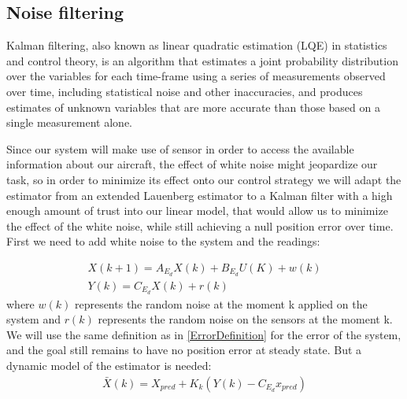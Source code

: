\documentclass[twocolumn,showpacs,
    nofootinbib,aps,superscriptaddress,
    eqsecnum,prd,showkeys,10pt,floatfix]{revtex4}
\begin{document}
\subsection{Noise filtering}
Kalman filtering, also known as linear quadratic estimation (LQE) in statistics
and control theory, is an algorithm that estimates a joint probability
distribution over the variables for each time-frame using a series of
measurements observed over time, including statistical noise and other
inaccuracies, and produces estimates of unknown variables that are more
accurate than those based on a single measurement alone.
\par
Since our system will make use of sensor in order to access the available
information about our aircraft, the effect of white noise might jeopardize our
task, so in order to minimize its effect onto our control strategy we will
adapt the estimator from an extended Lauenberg estimator to a Kalman filter
with a high enough amount of trust into our linear model, that would allow us to
minimize the effect of the white noise, while still achieving a null position error over
time. First we need to add white noise to the system and the readings:
\par
\begin{align}
    X(k+1)=A_{E_d}X(k)+B_{E_d}U(K)+w(k) \\
    Y(k)=C_{E_d}X(k)+r(k)
    \label{LinearDiscreteExtendedSystemWithWhiteNoiseFormula}
\end{align}
where $w(k)$ represents the random noise at the moment k applied on the system and $r(k)$ represents the random noise on the sensors at the moment k.
We will use the same definition as in {\ref{ErrorDefinition}} for the error of the system, and the goal still remains to have no position error at steady state.
But a dynamic model of the estimator is needed:
\begin{align}
    \bar{X}(k)=X_{pred}+K_k(Y(k)-C_{E_d}x_{pred})
    \label{KalmanCorrection}
\end{align}
\end{document}
